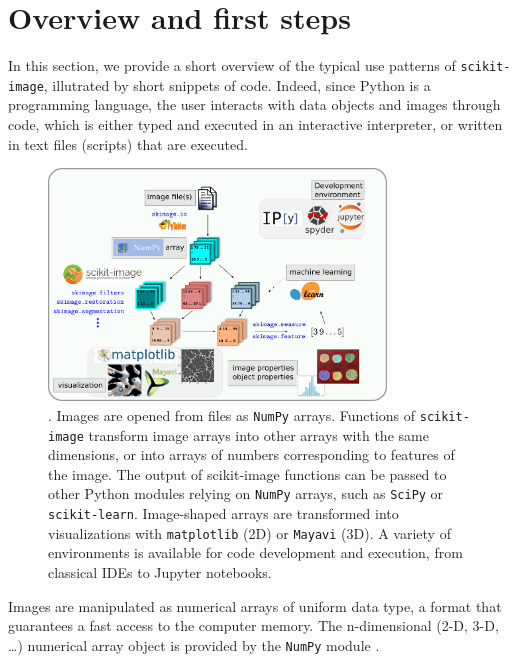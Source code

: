 \documentclass[twocolumn]{bmcart}%
\begin{document}
\section*{Overview and first steps}

In this section, we provide a short overview of the typical use patterns of
\texttt{scikit-image}, illutrated by short snippets of code. Indeed, since
Python is a programming language, the user interacts with data objects and
images through code, which is either typed and executed in an interactive
interpreter, or written in text files (scripts) that are executed. 

\begin{figure}
    \centerline{\includegraphics[width=0.8\textwidth]{ecosystem_landscape}}
    \caption{. Images are opened from files as \texttt{NumPy}
	arrays. Functions of \texttt{scikit-image} transform image arrays
	into other arrays with the same dimensions, or into arrays of
	numbers corresponding to features of the image. The output of
	scikit-image functions can be passed to other Python modules
	relying on \texttt{NumPy} arrays, such as \texttt{SciPy} or
	\texttt{scikit-learn}. Image-shaped arrays are transformed into
	visualizations with \texttt{matplotlib} (2D) or \texttt{Mayavi}
	(3D). A variety of environments is available for code development
	and execution, from classical IDEs to Jupyter notebooks.
    \label{fig:ecosystem}}
\end{figure}


Images are manipulated as numerical arrays of uniform
data type, a format that guarantees a fast access to the computer memory. The
n-dimensional (2-D, 3-D, \dots) numerical array object is provided by the
\texttt{NumPy} module \citep{Vanderwalt2011}.
\end{document}
